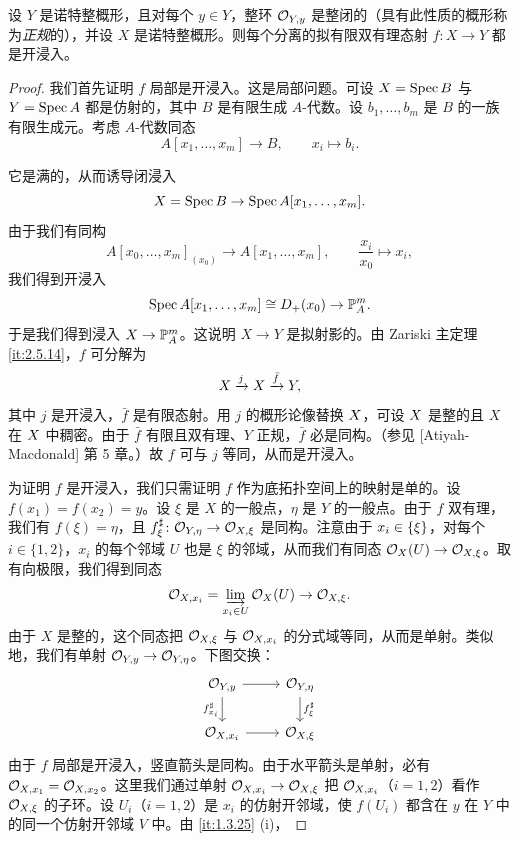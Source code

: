 \begin{corollary}\label{it:2.5.15}
设 $Y$ 是诺特整概形，且对每个 $y\in Y$，整环 $\mathcal{O}_{Y,y}$ 是整闭的（具有此性质的概形称为\emph{正规}的），并设 $X$ 是诺特整概形。则每个分离的拟有限双有理态射 $f\colon X\to Y$ 都是开浸入。
\end{corollary}

\begin{proof}
我们首先证明 $f$ 局部是开浸入。这是局部问题。可设 $X=\operatorname{Spec} B$ 与 $Y=\operatorname{Spec} A$ 都是仿射的，其中 $B$ 是有限生成 $A$-代数。设 $b_1,\dots,b_m$ 是 $B$ 的一族有限生成元。考虑 $A$-代数同态
\[
A[x_1,\dots,x_m]\to B,\qquad x_i\mapsto b_i.
\]

它是满的，从而诱导闭浸入
\[
X=\operatorname{Spec} B\to\operatorname{Spec} A[x_1,\dots,x_m].
\]
由于我们有同构
\[
A[x_0,\dots,x_m]_{(x_0)}\to A[x_1,\dots,x_m],\qquad \frac{x_i}{x_0}\mapsto x_i,
\]
我们得到开浸入
\[
\operatorname{Spec} A[x_1,\dots,x_m]\cong D_+(x_0)\to\mathbb{P}^m_A.
\]
于是我们得到浸入 $X\to\mathbb{P}^m_A$。这说明 $X\to Y$ 是拟射影的。由 Zariski 主定理 \ref{it:2.5.14}，$f$ 可分解为
\[
X\xrightarrow{j}X\xrightarrow{\bar f}Y,
\]
其中 $j$ 是开浸入，$\bar f$ 是有限态射。用 $j$ 的概形论像替换 $X$，可设 $X$ 是整的且 $X$ 在 $X$ 中稠密。由于 $\bar f$ 有限且双有理、$Y$ 正规，$\bar f$ 必是同构。（参见 [Atiyah-Macdonald] 第 5 章。）故 $f$ 可与 $j$ 等同，从而是开浸入。

为证明 $f$ 是开浸入，我们只需证明 $f$ 作为底拓扑空间上的映射是单的。设 $f(x_1)=f(x_2)=y$。设 $\xi$ 是 $X$ 的一般点，$\eta$ 是 $Y$ 的一般点。由于 $f$ 双有理，我们有 $f(\xi)=\eta$，且 $f^{\sharp}_{\xi}\colon\mathcal{O}_{Y,\eta}\to\mathcal{O}_{X,\xi}$ 是同构。注意由于 $x_i\in\{\xi\}$，对每个 $i\in\{1,2\}$，$x_i$ 的每个邻域 $U$ 也是 $\xi$ 的邻域，从而我们有同态 $\mathcal{O}_X(U)\to\mathcal{O}_{X,\xi}$。取有向极限，我们得到同态
\[
\mathcal{O}_{X,x_i}=\varinjlim_{x_i\in U}\mathcal{O}_X(U)\to\mathcal{O}_{X,\xi}.
\]
由于 $X$ 是整的，这个同态把 $\mathcal{O}_{X,\xi}$ 与 $\mathcal{O}_{X,x_i}$ 的分式域等同，从而是单射。类似地，我们有单射 $\mathcal{O}_{Y,y}\to\mathcal{O}_{Y,\eta}$。下图交换：
\[
\begin{tikzcd}
\cO_{Y,y}\arrow[r]\arrow[d,"f^{\sharp}_{x_i}"'] & \cO_{Y,\eta}\arrow[d,"f^{\sharp}_{\xi}"]\\
\cO_{X,x_i}\arrow[r] & \cO_{X,\xi}
\end{tikzcd}
\]
由于 $f$ 局部是开浸入，竖直箭头是同构。由于水平箭头是单射，必有 $\mathcal{O}_{X,x_1}=\mathcal{O}_{X,x_2}$。这里我们通过单射 $\mathcal{O}_{X,x_i}\to\mathcal{O}_{X,\xi}$ 把 $\mathcal{O}_{X,x_i}$（$i=1,2$）看作 $\mathcal{O}_{X,\xi}$ 的子环。设 $U_i$（$i=1,2$）是 $x_i$ 的仿射开邻域，使 $f(U_i)$ 都含在 $y$ 在 $Y$ 中的同一个仿射开邻域 $V$ 中。由 \ref{it:1.3.25} (i)，


\end{proof}
